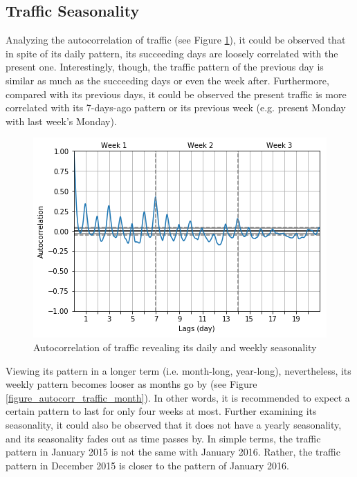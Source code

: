 \subsection{Traffic Seasonality}

Analyzing the autocorrelation of traffic (see Figure \ref{figure_autocorr_week}), it could be observed that in spite of its daily pattern, its succeeding days are loosely correlated with the present one. Interestingly, though, the traffic pattern of the previous day is similar as much as the succeeding days or even the week after. Furthermore, compared with its previous days, it could be observed the present traffic is more correlated with its 7-days-ago pattern or its previous week (e.g. present Monday with last week's Monday).


\begin{figure}
  \includegraphics[width=\linewidth]{figures/figure_autocorr_week.png}
  \caption{Autocorrelation of traffic revealing its daily and weekly seasonality}
  \label{figure_autocorr_week}
\end{figure}


Viewing its pattern in a longer term (i.e. month-long, year-long), nevertheless, its weekly pattern becomes looser as months go by (see Figure \ref{figure_autocorr_traffic_month}). In other words, it is recommended to expect a certain pattern to last for only four weeks at most. Further examining its seasonality, it could also be observed that it does not have a yearly seasonality, and its seasonality fades out as time passes by. In simple terms, the traffic pattern in January 2015 is not the same with January 2016. Rather, the traffic pattern in December 2015 is closer to the pattern of January 2016.


